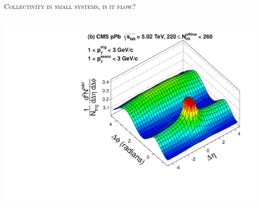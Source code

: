 \documentclass[aspectratio=169]{beamer}
\begin{document}
\begin{frame}{\scshape Collectivity in small systems, is it flow?}
\begin{columns}[T]
\begin{column}{.3\textwidth}
      \includegraphics[width=\columnwidth]{ppb_corr2d}
    \end{column}
  \end{columns}

\end{frame}
\end{document}
